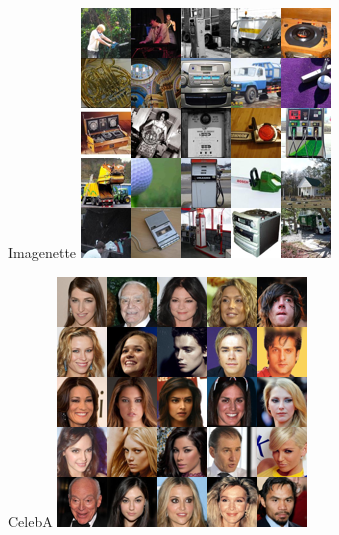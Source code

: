 \begin{figure}[H]
    \centering
    \noindent%
    \begin{minipage}{0.25\textwidth}
        \centering
        Imagenette 
        \includegraphics[width=\textwidth]{img/ds-imagenette.png}
    \end{minipage}
    \begin{minipage}{0.25\textwidth}
        \centering
        CelebA 
        \includegraphics[width=\textwidth]{img/ds-celeba.png}

\end{minipage}
\end{figure}
